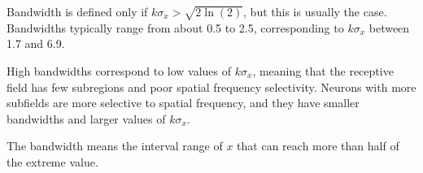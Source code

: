 \begin{rem}
  Bandwidth is defined only if $k\sigma_x > \sqrt{2\ln(2)}$, but this is usually the case. Bandwidths typically range from about 0.5 to 2.5, corresponding to $k\sigma_x$ between 1.7 and 6.9.
\end{rem}

\begin{rem}
  High bandwidths correspond to low values of $k\sigma_x$, meaning that the receptive field has few subregions and poor spatial frequency selectivity. Neurons with more subfields are more selective to spatial frequency, and they have smaller bandwidths and larger values of $k\sigma_x$.
\end{rem}

\begin{solution}
  The bandwidth means the interval range of $x$ that can reach more than half of the extreme value.
\end{solution}

